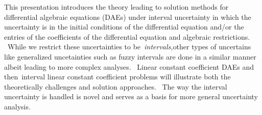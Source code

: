 
This presentation introduces the theory leading to solution methods for
differential algebraic equations (DAEs) under interval uncertainty in which
the uncertainty is in the initial conditions of the differential equation
and/or the entries of the coefficients of the differential equation and
algebraic restrictions. \ While we restrict these uncertainties to
be\textit{\ intervals,}other types of uncertains like generalized uncetainties
such as fuzzy intervals are done in a similar manner albeit leading to more
complex analyses. \ Linear constant coefficient DAEs and then\ interval linear
constant coefficient problems will illustrate both the theoretically
challenges and solution approaches. \ The way the interval uncertainty is
handled is novel and serves as a basis for more general uncertainty analysis.

